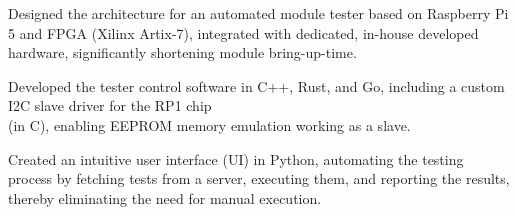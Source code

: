 \begin{zitemize}
    \item Designed the architecture for an automated module tester based on Raspberry Pi 5 and FPGA (Xilinx Artix-7), integrated with dedicated, in-house developed hardware, significantly shortening module bring-up-time.
    \item Developed the tester control software in C++, Rust, and Go, including a custom I2C slave driver for the RP1 chip \\ (in C), enabling EEPROM memory emulation working as a slave.
    \item Created an intuitive user interface (UI) in Python, automating the testing process by fetching tests from a server, executing them, and reporting the results, thereby eliminating the need for manual execution.
\end{zitemize}


% 
% 
